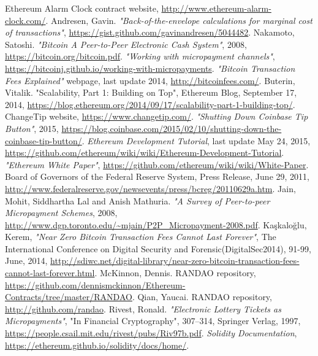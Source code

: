 \documentclass[a4paper]{article}
\begin{document}
\begin{thebibliography}{9}
 Ethereum Alarm Clock contract website, \url{http://www.ethereum-alarm-clock.com/}.
 Andresen, Gavin. \textit{"Back-of-the-envelope calculations for marginal cost of transactions"},
    \url{https://gist.github.com/gavinandresen/5044482}.
 Nakamoto, Satoshi. \textit{"Bitcoin A Peer-to-Peer Electronic Cash System"}, 2008,
    \url{https://bitcoin.org/bitcoin.pdf}.
 \textit{"Working with micropayment channels"},
    \url{https://bitcoinj.github.io/working-with-micropayments}.
 \textit{"Bitcoin Transaction Fees Explained"} webpage, last update 2014, \url{http://bitcoinfees.com/}.
 Buterin, Vitalik. "Scalability, Part 1: Building on Top", Ethereum Blog, September 17, 2014,
    \url{https://blog.ethereum.org/2014/09/17/scalability-part-1-building-top/}.
 ChangeTip website, \url{https://www.changetip.com/}.
 \textit{"Shutting Down Coinbase Tip Button"}, 2015,
    \url{https://blog.coinbase.com/2015/02/10/shutting-down-the-coinbase-tip-button/}.
 \textit{Ethereum Development Tutorial}, last update May 24, 2015,
    \url{https://github.com/ethereum/wiki/wiki/Ethereum-Development-Tutorial}.
 \textit{"Ethereum White Paper"}, \url{https://github.com/ethereum/wiki/wiki/White-Paper}.
 Board of Governors of the Federal Reserve System, Press Release, June 29, 2011,
    \url{http://www.federalreserve.gov/newsevents/press/bcreg/20110629a.htm}.
 Jain, Mohit, Siddhartha Lal and Anish Mathuria. \textit{"A Survey of Peer-to-peer Micropayment Schemes},
    2008, \url{http://www.dgp.toronto.edu/~mjain/P2P_Micropayment-2008.pdf}.
Kaşkaloğlu, Kerem, \textit{"Near Zero Bitcoin Transaction Fees Cannot Last Forever"},
    The International Conference on Digital Security and Forensic(DigitalSec2014), 91-99, June, 2014,
    \url{http://sdiwc.net/digital-library/near-zero-bitcoin-transaction-fees-cannot-last-forever.html}.
 McKinnon, Dennis. RANDAO repository,
    \url{https://github.com/dennismckinnon/Ethereum-Contracts/tree/master/RANDAO}.
 Qian, Yaucai. RANDAO repository, \url{http://github.com/randao}.
 Rivest, Ronald. \textit{"Electronic Lottery Tickets as Micropayments"},
    "In Financial Cryptography", 307--314, Springer Verlag, 1997,
    \url{https://people.csail.mit.edu/rivest/pubs/Riv97b.pdf}.
 \textit{Solidity Documentation}, \url{https://ethereum.github.io/solidity/docs/home/}.

\end{thebibliography}
\end{document}
